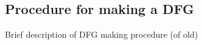 \subsection{Procedure for making a DFG}\label{sec:DFGsequence}
Brief description of DFG making procedure (of old)

